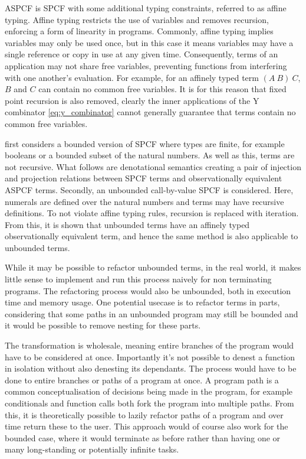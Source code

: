 \documentclass[12pt,a4paper]{report}
\theoremstyle{definition}
\theoremstyle{remark}
\begin{document}
ASPCF is SPCF with some additional typing constraints, referred to as affine typing. Affine typing restricts the use of variables and removes recursion, enforcing a form of linearity in programs. Commonly, affine typing implies variables may only be used once, but in this case it means variables may have a single reference or copy in use at any given time. Consequently, terms of an application may not share free variables, preventing functions from interfering with one another's evaluation. For example, for an affinely typed term $(A\ B)\ C$, $B$ and $C$ can contain no common free variables. It is for this reason that fixed point recursion is also removed, clearly the inner applications of the Y combinator \eqref{eq:y_combinator} cannot generally guarantee that terms contain no common free variables.

\cite{laird_2007} first considers a bounded version of SPCF where types are finite, for example booleans or a bounded subset of the natural numbers. As well as this, terms are not recursive. What follows are denotational semantics creating a pair of injection and projection relations between SPCF terms and observationally equivalent ASPCF terms. Secondly, an unbounded call-by-value SPCF is considered. Here, numerals are defined over the natural numbers and terms may have recursive definitions. To not violate affine typing rules, recursion is replaced with iteration. From this, it is shown that unbounded terms have an affinely typed observationally equivalent term, and hence the same method is also applicable to unbounded terms.

While it may be possible to refactor unbounded terms, in the real world, it makes little sense to implement and run this process naively for non terminating programs. The refactoring process would also be unbounded, both in execution time and memory usage. One potential usecase is to refactor terms in parts, considering that some paths in an unbounded program may still be bounded and it would be possible to remove nesting for these parts.

The transformation is wholesale, meaning entire branches of the program would have to be considered at once. Importantly it's not possible to denest a function in isolation without also denesting its dependants. The process would have to be done to entire branches or paths of a program at once. A program path is a common conceptualisation of decisions being made in the program, for example conditionals and function calls both fork the program into multiple paths. From this, it is theoretically possible to lazily refactor paths of a program and over time return these to the user. This approach would of course also work for the bounded case, where it would terminate as before rather than having one or many long-standing or potentially infinite tasks. 
\end{document}
